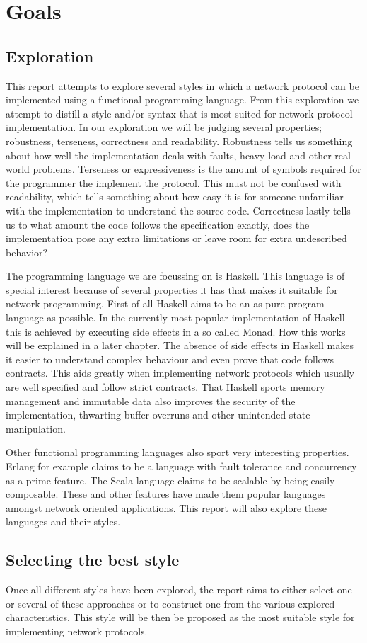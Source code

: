 \chapter{Goals}
\section{Exploration}
This report attempts to explore several styles in which a network protocol can be implemented using a functional programming language. From this exploration we attempt to distill a style and/or syntax that is most suited for network protocol implementation. In our exploration we will be judging several properties; robustness, terseness, correctness and readability. Robustness tells us something about how well the implementation deals with faults, heavy load and other real world problems. Terseness or expressiveness is the amount of symbols required for the programmer the implement the protocol. This must not be confused with readability, which tells something about how easy it is for someone unfamiliar with the implementation to understand the source code. Correctness lastly tells us to what amount the code follows the specification exactly, does the implementation pose any extra limitations or leave room for extra undescribed behavior?

The programming language we are focussing on is Haskell. This language is of special interest because of several properties it has that makes it suitable for network programming. First of all Haskell aims to be an as pure program language as possible. In the currently most popular implementation of Haskell this is achieved by executing side effects in a so called Monad. How this works will be explained in a later chapter. The absence of side effects in Haskell makes it easier to understand complex behaviour and even prove that code follows contracts. This aids greatly when implementing network protocols which usually are well specified and follow strict contracts. That Haskell sports memory management and immutable data also improves the security of the implementation, thwarting buffer overruns and other unintended state manipulation.

Other functional programming languages also sport very interesting properties. Erlang for example claims to be a language with fault tolerance and concurrency as a prime feature\cite{armstrong_concurrent_1993}. The Scala language claims to be scalable by being easily composable\cite{odersky_overview_????}. These and other features have made them popular languages amongst network oriented applications. This report will also explore these languages and their styles.

\section{Selecting the best style}
Once all different styles have been explored, the report aims to either select one or several of these approaches or to construct one from the various explored characteristics. This style will be then be proposed as the most suitable style for implementing network protocols.
